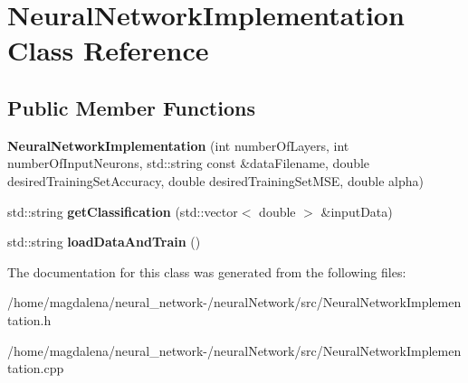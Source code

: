 \hypertarget{classNeuralNetworkImplementation}{}\section{Neural\+Network\+Implementation Class Reference}
\label{classNeuralNetworkImplementation}
\subsection*{Public Member Functions}
\begin{DoxyCompactItemize}
\item 
\mbox{\label{classNeuralNetworkImplementation_ace88a14ae1b4b6549500a5bdb3338834}} 
{\bfseries Neural\+Network\+Implementation} (int number\+Of\+Layers, int number\+Of\+Input\+Neurons, std\+::string const \&data\+Filename, double desired\+Training\+Set\+Accuracy, double desired\+Training\+Set\+M\+SE, double alpha)
\item 
\mbox{\label{classNeuralNetworkImplementation_a8ac321d48e1b24fece35f5efb3a7a598}} 
std\+::string {\bfseries get\+Classification} (std\+::vector$<$ double $>$ \&input\+Data)
\item 
\mbox{\label{classNeuralNetworkImplementation_a0eb89743ab3777a68ba60787db245ca0}} 
std\+::string {\bfseries load\+Data\+And\+Train} ()
\end{DoxyCompactItemize}


The documentation for this class was generated from the following files\+:\begin{DoxyCompactItemize}
\item 
/home/magdalena/neural\+\_\+network-\//neural\+Network/src/Neural\+Network\+Implementation.\+h\item 
/home/magdalena/neural\+\_\+network-\//neural\+Network/src/Neural\+Network\+Implementation.\+cpp\end{DoxyCompactItemize}
